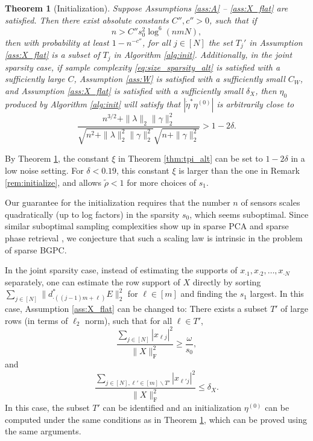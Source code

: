 \documentclass[11pt,journal]{IEEEtran}
\newcommand{\rmF}{\mathrm{F}}
\newcommand{\norm}[1]{\|{#1}\|}
\newtheorem{theorem}{Theorem}[section]
\begin{document}
\begin{theorem}[Initialization] \label{thm:init}
Suppose Assumptions \ref{ass:A} -- \ref{ass:X_flat} are satisfied. Then there exist absolute constants $C'', c''>0$, such that if
\[
n > C'' s_0^2 \log^6 (nmN),
\]
then with probability at least $1-n^{-c''}$, for all $j\in [N]$ the set $T_j'$ in Assumption \ref{ass:X_flat} is a subset of $T_j$ in Algorithm \ref{alg:init}. 
Additionally, in the joint sparsity case, if
sample complexity \eqref{eq:size_sparsity_alt} is satisfied with a sufficiently large $C$, Assumption \ref{ass:W} is satisfied with a sufficiently small $C_W$, and Assumption \ref{ass:X_flat} is satisfied with a sufficiently small $\delta_X$, then $\eta_0$ produced by Algorithm \ref{alg:init} will satisfy that $|\dot{\eta}^* \eta^{(0)}|$ is arbitrarily close to 
\[
\frac{n^{3/2}+\norm{\lambda}_2\norm{\gamma}_2^2}{\sqrt{n^2+\norm{\lambda}_2^2\norm{\gamma}_2^2}\sqrt{n+\norm{\gamma}_2^2}} > 1-2\delta.
\]
\end{theorem}


By Theorem \ref{thm:init}, the constant $\xi$ in Theorem \ref{thm:tpi_alt} can be set to $1-2\delta$ in a low noise setting. For $\delta < 0.19$, this constant $\xi$ is larger than the one in Remark \ref{rem:initialize}, and allows $\tilde{\rho} < 1$ for more choices of $s_1$.

Our guarantee for the initialization requires that the number $n$ of sensors scales quadratically (up to log factors) in the sparsity $s_0$, which seems suboptimal. Since similar suboptimal sampling complexities show up in sparse PCA \cite{Berthet2013} and sparse phase retrieval \cite{Netrapalli2013,Cai2016,Jaganathan2017}, we conjecture that such a scaling law is intrinsic in the problem of sparse BGPC.

In the joint sparsity case, instead of estimating the supports of $x_{\cdot 1},x_{\cdot 2},\dots,x_{\cdot N}$ separately, one can estimate the row support of $X$ directly by sorting $\sum_{j\in[N]} \norm{d^*_{\cdot((j-1)m+\ell)}E}_2^2$ for $\ell\in [m]$ and finding the $s_1$ largest. In this case, Assumption \ref{ass:X_flat} can be changed to: There exists a subset $T'$ of large rows (in terms of $\ell_2$ norm), such that for all $\ell \in T'$,
\[
\frac{\sum_{j\in[N]} |x_{\ell j}|^2}{\norm{X}_\rmF^2} \geq \frac{\omega}{s_0},
\]
and
\[
\frac{\sum_{j\in [N], \ell' \in [m]\backslash T'} |x_{\ell' j}|^2}{\norm{X}_\rmF^2} \leq \delta_X.
\]
In this case, the subset $T'$ can be identified and an initialization $\eta^{(0)}$ can be computed under the same conditions as in Theorem \ref{thm:init}, which can be proved using the same arguments.
\end{document}
